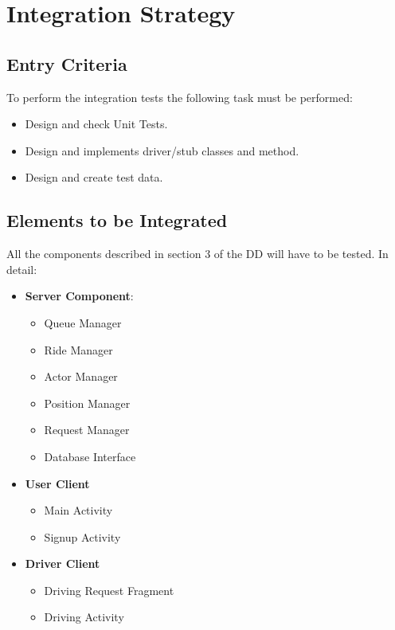 \section{Integration Strategy} %
\label{sec:integration_strategy}

\subsection{Entry Criteria} %
\label{sub:entry_criteria}
To perform the integration tests the following task must be performed:
\begin{itemize}
	\item Design and check Unit Tests.
	\item Design and implements driver/stub classes and method.
	\item Design and create test data.
\end{itemize}

\subsection{Elements to be Integrated} %
\label{sub:elements_to_be_integrated}
All the components described in section 3 of the DD will have to be tested.
In detail:
\begin{itemize}
	\item \textbf{Server Component}:
	\begin{itemize}
		\item Queue Manager
		\item Ride Manager
		\item Actor Manager
		\item Position Manager
		\item Request Manager
		\item Database Interface
	\end{itemize}
	\item \textbf{User Client}
	\begin{itemize}
		\item Main Activity
		\item Signup Activity
	\end{itemize}
	\item \textbf{Driver Client}
	\begin{itemize}
		\item Driving Request Fragment
		\item Driving Activity
	\end{itemize}
\end{itemize}

